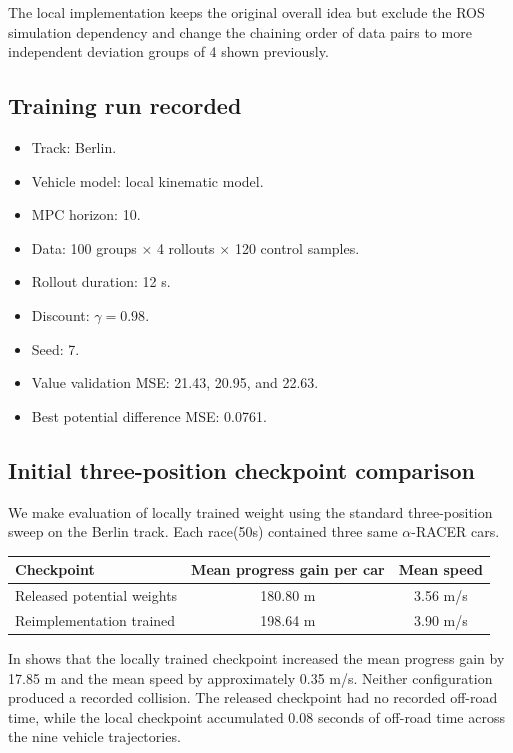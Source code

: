 \documentclass[11pt]{article}
\begin{document}
The local implementation keeps the original overall idea but exclude the ROS simulation dependency and change the chaining order of data pairs to more independent deviation groups of 4 shown previously.

\subsection{Training run recorded}

\begin{itemize}
  \item Track: Berlin.
  \item Vehicle model: local kinematic model.
  \item MPC horizon: 10.
  \item Data: 100 groups $\times$ 4 rollouts $\times$ 120 control samples.
  \item Rollout duration: 12 s.
  \item Discount: $\gamma=0.98$.
  \item Seed: 7.
  \item Value validation MSE: 21.43, 20.95, and 22.63.
  \item Best potential difference MSE: 0.0761.
\end{itemize}

\subsection{Initial three-position checkpoint comparison}

We make evaluation of locally trained weight using the standard three-position sweep on the Berlin track.
Each race(50s) contained three same $\alpha$-RACER cars.

\begin{center}
\small
\begin{tabular}{lcc}
\toprule
Checkpoint & Mean progress gain per car & Mean speed \\
\midrule
Released potential weights & 180.80 m & 3.56 m/s \\
Reimplementation trained & 198.64 m & 3.90 m/s \\
\bottomrule
\end{tabular} 
\end{center}

In shows that the locally trained checkpoint increased the mean
progress gain by 17.85 m and the mean speed by approximately 0.35 m/s. Neither configuration produced a recorded collision. The released checkpoint had no recorded off-road time, while the local checkpoint accumulated 0.08 seconds of off-road time across the nine vehicle trajectories.
\end{document}
